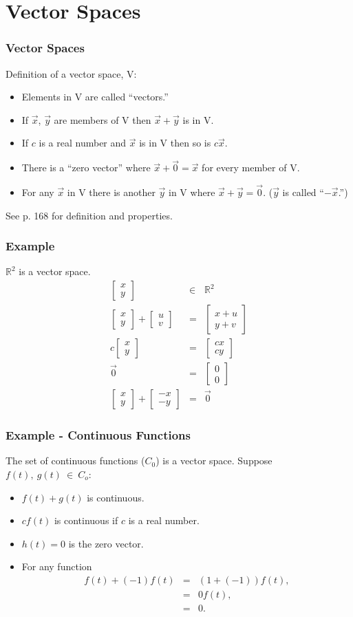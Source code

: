 \documentclass{beamer}
\newcommand{\vecTwo}[2]{
  \left[
  \begin{array}{r}
    #1 \\  #2
  \end{array}
  \right]
}
\begin{document}
\section{Vector Spaces}

\begin{frame}
  \frametitle{Vector Spaces}

  Definition of a vector space, V:
  \begin{itemize}
  \item Elements in V are called ``vectors.''
  \item If $\vec{x}$, $\vec{y}$ are members of V then
    $\vec{x}+\vec{y}$ is in V.
  \item If $c$ is a real number and $\vec{x}$ is in V then so is
    $c\vec{x}$.
  \item There is a ``zero vector'' where $\vec{x}+\vec{0}=\vec{x}$ for
    every member of V.
  \item For any $\vec{x}$ in V there is another $\vec{y}$ in V where
    $\vec{x}+\vec{y}=\vec{0}$. ($\vec{y}$ is called ``$-\vec{x}$.'')
  \end{itemize}

  See p. 168 for definition and properties.

\end{frame}

\begin{frame}
  \frametitle{Example}

  $\mathbb{R}^2$ is a vector space.
  \begin{eqnarray*}
    \vecTwo{x}{y} & \in & \mathbb{R}^2 \\
    \vecTwo{x}{y} + \vecTwo{u}{v} & = & \vecTwo{x+u}{y+v} \\
    c \vecTwo{x}{y} & = & \vecTwo{cx}{cy} \\
    \vec{0} & = & \vecTwo{0}{0} \\
    \vecTwo{x}{y} + \vecTwo{-x}{-y} & = & \vec{0}
  \end{eqnarray*}

\end{frame}


\begin{frame}
  \frametitle{Example - Continuous Functions}

  The set of continuous functions ($C_0$) is a vector space.
  Suppose $f(t),~g(t)~\in~C_o$:
  \begin{itemize}
  \item $f(t)+g(t)$ is continuous.
  \item $c f(t)$ is continuous if $c$ is a real number.
  \item $h(t)=0$ is the zero vector.
  \item For any function
    \begin{eqnarray*}
      f(t) + (-1)f(t) & = & (1 + (-1))f(t), \\
      & = & 0 f(t), \\
      & = & 0.
    \end{eqnarray*}
  \end{itemize}

\end{frame}
\end{document}
